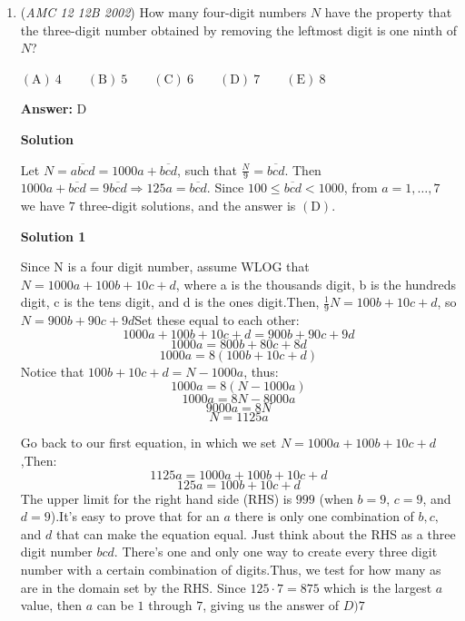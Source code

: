 \begin{enumerate}
\textbf{Solution 2}

Because a pair or circles can intersect at most $2$ times, the first circle can intersect the second at $2$ points, the third can intersect the first two at $4$ points, and the fourth can intersect the first three at $6$ points. This means that our answer is $2+4+6=\boxed{\mathrm{(D)}\ 12}.$




\textbf{Solution 3}

Pick a circle any circle- $4$ ways. Then, pick any other circle- $3$ ways. For each of these circles, there will be $2$ intersections for a total of $4*3*2$ = $24$ intersections. However, we have counted each intersection twice, so we divide for overcounting. Therefore, we reach a total of $\frac{24}{2}=\boxed{12}$, which corresponds to $\text{(D)}$.

 


	\item (\textit{AMC 12 12B 2002}) How many four-digit numbers $N$ have the property that the three-digit number obtained by removing the leftmost digit is one ninth of $N$?


 $\mathrm{(A)}\ 4 \qquad\mathrm{(B)}\ 5 \qquad\mathrm{(C)}\ 6 \qquad\mathrm{(D)}\ 7 \qquad\mathrm{(E)}\ 8$

 \textbf{Answer: }D



\textbf{Solution}

Let $N = \overline{abcd} = 1000a + \overline{bcd}$, such that $\frac{N}{9} = \overline{bcd}$. Then $1000a + \overline{bcd} = 9\overline{bcd} \Longrightarrow 125a = \overline{bcd}$. Since $100 \le \overline{bcd} < 1000$, from $a = 1, \ldots, 7$ we have $7$ three-digit solutions, and the answer is  $\mathrm{(D)}$. 

 


 



\textbf{Solution 1}

Since N is a four digit number, assume WLOG that $N = 1000a + 100b + 10c + d$, where a is the thousands digit, b is the hundreds digit, c is the tens digit, and d is the ones digit.Then, $\frac{1}{9}N = 100b + 10c + d$, so $N = 900b + 90c + 9d$Set these equal to each other:
 \[1000a + 100b + 10c + d = 900b + 90c + 9d\]
 \[1000a = 800b + 80c + 8d\]
 \[1000a = 8(100b + 10c + d)\]Notice that $100b + 10c + d = N - 1000a$, thus:
 \[1000a = 8(N - 1000a)\]
 \[1000a = 8N - 8000a\]
 \[9000a = 8N\]
 \[N = 1125a\]

 Go back to our first equation, in which we set $N = 1000a + 100b + 10c + d$,Then: 
 \[1125a = 1000a + 100b + 10c + d\]
 \[125a = 100b + 10c + d\]The upper limit for the right hand side (RHS) is $999$ (when $b = 9$, $c = 9$, and $d = 9$).It's easy to prove that for an $a$ there is only one combination of $b, c,$ and $d$ that can make the equation equal. Just think about the RHS as a three digit number $bcd$. There's one and only one way to create every three digit number with a certain combination of digits.Thus, we test for how many as are in the domain set by the RHS. Since $125\cdot7 = 875$ which is the largest $a$ value, then $a$ can be $1$ through $7$, giving us the answer of $\boxed {D) 7}$


\end{enumerate}
